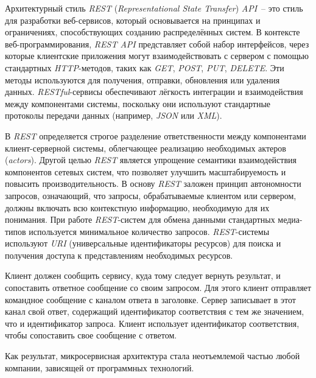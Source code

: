Архитектурный стиль \textit{REST} (\textit{Representational State Transfer}) \textit{API}~-- это стиль для разработки веб-сервисов, который основывается на принципах и ограничениях, способствующих созданию распределённых систем. В контексте веб-программирования, \textit{REST API} представляет собой набор интерфейсов, через которые клиентские приложения могут взаимодействовать с сервером с помощью стандартных \textit{HTTP}-методов, таких как \textit{GET}, \textit{POST}, \textit{PUT}, \textit{DELETE}. Эти методы используются для получения, отправки, обновления или удаления данных. \textit{RESTful}-сервисы обеспечивают лёгкость интеграции и взаимодействия между компонентами системы, поскольку они используют стандартные протоколы передачи данных (например, \textit{JSON} или \textit{XML}).

В \textit{REST} определяется строгое разделение ответственности между компонентами клиент-серверной системы, облегчающее реализацию необходимых актеров (\textit{actors}). Другой целью \textit{REST} является упрощение семантики взаимодействия компонентов сетевых систем, что позволяет улучшить масштабируемость и повысить производительность. В основу \textit{REST} заложен принцип автономности запросов, означающий, что запросы, обрабатываемые клиентом или сервером, должны включать всю контекстную информацию, необходимую для их понимания. При работе \textit{REST}-систем для обмена данными стандартных медиа-типов используется минимальное количество запросов. \textit{REST}-системы используют \textit{URI} (универсальные идентификаторы ресурсов) для поиска и получения доступа к представлениям необходимых ресурсов.

Клиент должен сообщить сервису, куда тому следует вернуть результат, и сопоставить ответное сообщение со своим запросом. Для этого клиент отправляет командное сообщение с каналом ответа в заголовке. Сервер записывает в этот канал свой ответ, содержащий идентификатор соответствия с тем же значением, что и идентификатор запроса. Клиент использует идентификатор соответствия, чтобы сопоставить свое сообщение с ответом.

Как результат, микросервисная архитектура стала неотъемлемой частью любой компании, зависящей от программных технологий.
